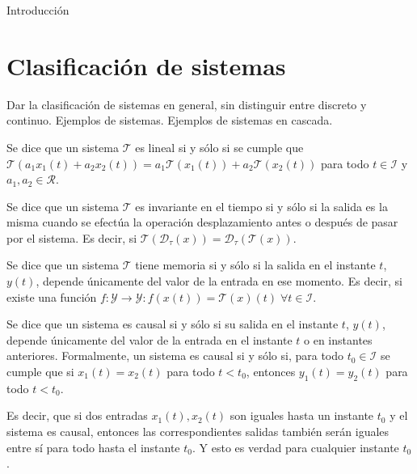 
Introducción 

\section{Clasificación de sistemas}

Dar la clasificación de sistemas en general, sin distinguir entre discreto y continuo. Ejemplos de sistemas. Ejemplos de sistemas en cascada.

\begin{definition}[Linearidad]
    Se dice que un sistema $\mathcal{T}$ es lineal si y sólo si se cumple que $\mathcal{T}(a_1x_1(t) + a_2x_2(t)) = a_1\mathcal{T}(x_1(t)) + a_2\mathcal{T}(x_2(t))$ para todo $t \in \mathcal{I}$ y $a_1,a_2 \in \mathcal{R}$.    
\end{definition}

\begin{definition}
    Se dice que un sistema $\mathcal{T}$ es invariante en el tiempo si y sólo si la salida es la misma cuando se efectúa la operación desplazamiento antes o después de pasar por el sistema. Es decir, si $\mathcal{T}(\mathcal{D}_{\tau}(x)) = \mathcal{D}_{\tau}(\mathcal{T}(x))$.
\end{definition}

\begin{definition}[Memoria]
    Se dice que un sistema $\mathcal{T}$ tiene memoria si y sólo si la salida en el instante $t$, $y(t)$, depende únicamente del valor de la entrada en ese momento. Es decir, si existe una función $f: \mathcal{Y} \rightarrow \mathcal{Y} : f(x(t)) = \mathcal{T}(x)(t) \; \forall t \in \mathcal{I}$.
\end{definition}

\begin{definition}[Causalidad]
    Se dice que un sistema es causal si y sólo si su salida en el instante $t$, $y(t)$, depende únicamente del valor de la entrada en el instante $t$ o en instantes anteriores. Formalmente, un sistema es causal si y sólo si, para todo $t_0 \in \mathcal{I}$ se cumple que si $x_1(t) = x_2(t)$ para todo $t < t_0$, entonces $y_1(t) = y_2(t)$ para todo $t < t_0$.
\end{definition}

Es decir, que si dos entradas $x_1(t),x_2(t)$ son iguales hasta un instante $t_0$ y el sistema es causal, entonces las correspondientes salidas también serán iguales entre sí para todo hasta el instante $t_0$. Y esto es verdad para cualquier instante $t_0$.

